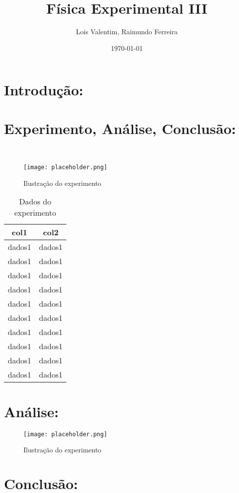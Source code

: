 \documentclass{article}
\title{Física Experimental III}
\author{Lois Valentim, Raimundo Ferreira}
\date{\today}
\begin{document}
\maketitle

\section{Introdução:}
    \lipsum[1-2]
    \cite{abcd}

\section{Experimento, Análise, Conclusão:}
    \lipsum[1-2] 
    \cite{ref10}
    \\
    
    \begin{figure}[h]
        \centering
        \texttt{[image: placeholder.png]}
        \caption{Ilustração do experimento}
    \end{figure}
    
\begin{table}[h]
    \centering
    \begin{tabular}{c|c}
    \hline
    col1 & col2 \\
    \hline
    dados1     &  dados1 \\
    dados1     &  dados1 \\
    dados1     &  dados1 \\
    dados1     &  dados1 \\
    dados1     &  dados1 \\
    dados1     &  dados1 \\
    dados1     &  dados1 \\
    dados1     &  dados1 \\
    dados1     &  dados1 \\
    dados1     &  dados1 \\
    \end{tabular}
    \caption{Dados do experimento}
    \label{tab:my_label}
\end{table}

\section{Análise:}
    \lipsum[1-2]

        \begin{figure}[h]
        \centering
        \texttt{[image: placeholder.png]}
        \caption{Ilustração do experimento}
    \end{figure}

\section{Conclusão:}
    \lipsum[1-2]
    \cite{oi}



\end{document}
